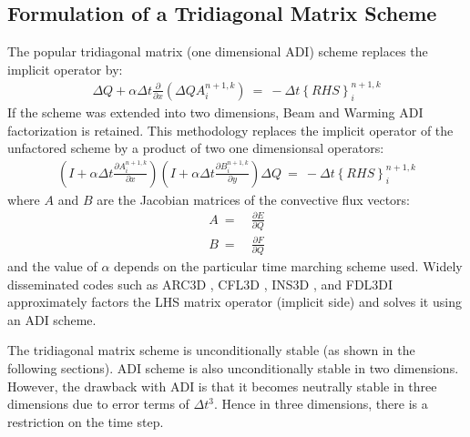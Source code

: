 \documentclass[conf]{new-aiaa}
\begin{document}
\subsection{Formulation of a Tridiagonal Matrix Scheme}
The popular tridiagonal matrix (one dimensional ADI) scheme replaces the implicit operator by: 
\begin{equation}
	\begin{split}
		\label{eq:TriDi}
  			\Delta{Q}+\alpha\Delta{t}\frac{\partial{}}{\partial{x}}\left(\Delta{Q}A_i^{n+1,k}\right)~=~-\Delta{t}\left\{RHS\right\}_i^{n+1, k}
	\end{split}
\end{equation}
If the scheme was extended into two dimensions, Beam and Warming \cite{Beam} ADI factorization is retained. This methodology replaces the implicit operator of the unfactored scheme by a product of two one dimensionsal operators: 
\begin{equation}
	\begin{split}
		\label{eq:ADI}
  			\left(I+\alpha\Delta{t}\frac{\partial{A_i^{n+1,k}}}{\partial{x}}\right)\left(I+\alpha\Delta{t}\frac{\partial{B_i^{n+1,k}}}{\partial{y}}\right)\Delta{Q}~=~-\Delta{t}\left\{RHS\right\}_i^{n+1, k}
	\end{split}
\end{equation}
where $A$ and $B$ are the Jacobian matrices of the convective flux vectors:
\begin{equation}
	\begin{split}
		\label{eq:}
  			A~=&~\frac{\partial{E}}{\partial{Q}} \\
  			B~=&~\frac{\partial{F}}{\partial{Q}}
	\end{split}
\end{equation}
and the value of $\alpha$ depends on the particular time marching scheme used. Widely disseminated codes such as ARC3D \cite{ARC3D}, CFL3D \cite{CFL3D}, INS3D \cite{INS3D}, and FDL3DI \cite{FDL3DI_A, FDL3DI_B, FDL3DI_C} approximately factors the LHS matrix operator (implicit side) and solves it using an ADI scheme. 

The tridiagonal matrix scheme is unconditionally stable (as shown in the following sections). ADI scheme is also unconditionally stable in two dimensions. However, the drawback with ADI is that it becomes neutrally stable in three dimensions due to error terms of $\Delta{t}^3$. 
Hence in three dimensions, there is a restriction on the time step.
\end{document}
